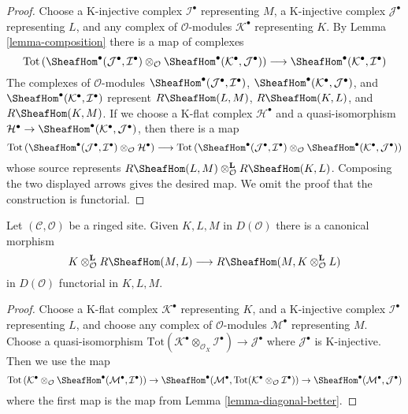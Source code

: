 \begin{proof}
Choose a K-injective complex $\mathcal{I}^\bullet$ representing $M$,
a K-injective complex $\mathcal{J}^\bullet$ representing $L$, and
any complex of $\mathcal{O}$-modules $\mathcal{K}^\bullet$ representing $K$.
By Lemma \ref{lemma-composition} there is a map of complexes
$$
\text{Tot}\left(
\SheafHom^\bullet(\mathcal{J}^\bullet, \mathcal{I}^\bullet)
\otimes_\mathcal{O}
\SheafHom^\bullet(\mathcal{K}^\bullet, \mathcal{J}^\bullet)
\right)
\longrightarrow
\SheafHom^\bullet(\mathcal{K}^\bullet, \mathcal{I}^\bullet)
$$
The complexes of $\mathcal{O}$-modules
$\SheafHom^\bullet(\mathcal{J}^\bullet, \mathcal{I}^\bullet)$,
$\SheafHom^\bullet(\mathcal{K}^\bullet, \mathcal{J}^\bullet)$, and
$\SheafHom^\bullet(\mathcal{K}^\bullet, \mathcal{I}^\bullet)$
represent $R\SheafHom(L, M)$, $R\SheafHom(K, L)$, and $R\SheafHom(K, M)$.
If we choose a K-flat complex $\mathcal{H}^\bullet$ and a quasi-isomorphism
$\mathcal{H}^\bullet \to
\SheafHom^\bullet(\mathcal{K}^\bullet, \mathcal{J}^\bullet)$,
then there is a map
$$
\text{Tot}\left(
\SheafHom^\bullet(\mathcal{J}^\bullet, \mathcal{I}^\bullet)
\otimes_\mathcal{O} \mathcal{H}^\bullet
\right)
\longrightarrow
\text{Tot}\left(
\SheafHom^\bullet(\mathcal{J}^\bullet, \mathcal{I}^\bullet)
\otimes_\mathcal{O}
\SheafHom^\bullet(\mathcal{K}^\bullet, \mathcal{J}^\bullet)
\right)
$$
whose source represents
$R\SheafHom(L, M) \otimes_\mathcal{O}^\mathbf{L} R\SheafHom(K, L)$.
Composing the two displayed arrows gives the desired map. We omit the
proof that the construction is functorial.
\end{proof}

\begin{lemma}
\label{lemma-internal-hom-diagonal-better}
Let $(\mathcal{C}, \mathcal{O})$ be a ringed site. Given $K, L, M$
in $D(\mathcal{O})$ there is a canonical morphism
$$
K \otimes_\mathcal{O}^\mathbf{L} R\SheafHom(M, L)
\longrightarrow
R\SheafHom(M, K \otimes_\mathcal{O}^\mathbf{L} L)
$$
in $D(\mathcal{O})$ functorial in $K, L, M$.
\end{lemma}

\begin{proof}
Choose a K-flat complex $\mathcal{K}^\bullet$ representing $K$,
and a K-injective complex $\mathcal{I}^\bullet$ representing $L$, and
choose any complex of $\mathcal{O}$-modules $\mathcal{M}^\bullet$
representing $M$. Choose a quasi-isomorphism
$\text{Tot}(\mathcal{K}^\bullet \otimes_{\mathcal{O}_X} \mathcal{I}^\bullet)
\to \mathcal{J}^\bullet$
where $\mathcal{J}^\bullet$ is K-injective. Then we use the map
$$
\text{Tot}\left(
\mathcal{K}^\bullet \otimes_\mathcal{O}
\SheafHom^\bullet(\mathcal{M}^\bullet, \mathcal{I}^\bullet)
\right)
\to
\SheafHom^\bullet(\mathcal{M}^\bullet,
\text{Tot}(\mathcal{K}^\bullet \otimes_\mathcal{O} \mathcal{I}^\bullet))
\to
\SheafHom^\bullet(\mathcal{M}^\bullet, \mathcal{J}^\bullet)
$$
where the first map is the map from Lemma \ref{lemma-diagonal-better}.
\end{proof}

